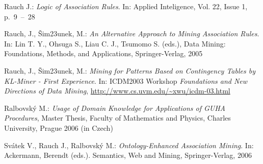 \documentclass{llncs}
\begin{document}
\begin{thebibliography}{20}
Rauch J.: \emph{Logic of Association Rules}. In: Applied Inteligence, Vol. 22,
Issue 1, p.~9~--~28

Rauch, J., \v{S}im\accent23unek, M.: \emph{An Alternative Approach to Mining
Association Rules}. In: Lin T. Y., Ohsuga S., Liau C. J., Tsumomo S. (eds.),
Data Mining: Foundations, Methods, and Applications, Springer-Verlag, 2005

Rauch, J., \v{S}im\accent23unek, M.: \emph{Mining for Patterns Based on 
Contingency Tables by KL-Miner - First Experience}. In: ICDM2003 Workshop
\emph{Foundations and New Directions of Data Mining}, \url{http://www.cs.uvm.edu/~xwu/icdm-03.html}

Ralbovsk\'{y} M.: \emph{Usage of Domain Knowledge for Applications of GUHA
Procedures}, Master Thesis, Faculty of Mathematics and Physics, Charles University,
Prague 2006 (in Czech)

Sv\'{a}tek V., Rauch J., Ralbovsk\'{y} M.: \emph{Ontology-Enhanced Association
Mining}. In: Ackermann, Berendt (eds.). Semantics, Web and Mining, 
Springer-Verlag, 2006

\end{thebibliography}
\end{document}
